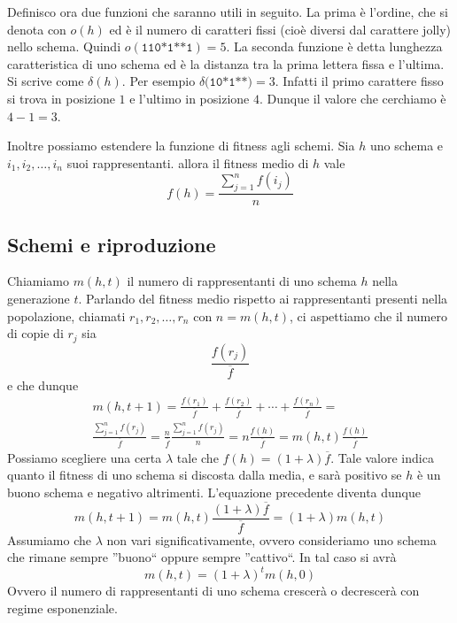 \documentclass[a4paper, 11pt]{article}
\newcommand{\code}{\texttt}
\begin{document}
Definisco ora due funzioni che saranno utili in seguito. La prima \`e l'ordine,
che si denota con $o(h)$ ed \`e il numero di caratteri fissi (cio\`e diversi dal
carattere jolly) nello schema. Quindi $o(\code{110*1**1})=5$. La seconda
funzione \`e detta lunghezza caratteristica di uno schema ed \`e la distanza tra
la prima lettera fissa e l'ultima. Si scrive come $\delta(h)$. Per esempio
$\delta( \code{10*1**)} = 3$. Infatti il primo carattere fisso si trova in
posizione $1$ e l'ultimo in posizione $4$.  Dunque il valore che cerchiamo \`e
$4-1=3$.

Inoltre possiamo estendere la funzione di fitness agli schemi. Sia $h$ uno
schema e $i_1, i_2, \ldots ,i_n$ suoi rappresentanti. allora il fitness medio di
$h$ vale $$f(h)=\frac{\sum\limits_{j=1}^n f(i_j)}{n}$$



\subsection{Schemi e riproduzione}

Chiamiamo $m(h, t)$ il numero di rappresentanti di uno schema $h$ nella
generazione $t$. Parlando del fitness medio rispetto ai rappresentanti presenti
nella popolazione, chiamati $r_1, r_2, \ldots, r_n$ con $n=m(h,t)$, ci
aspettiamo che il numero di copie di $r_j$ sia 
$$\frac{f(r_j)}{\overline{f}}$$
e che dunque
\begin{align*}
m(h,t+1) =
\frac{f(r_1)}{\overline{f}}
+\frac{f(r_2)}{\overline{f}}+ \cdots +
\frac{f(r_n)}{\overline{f}} =\\
\frac{\sum\limits_{j=1}^n f(r_j)}{\overline{f}} =
\frac{n}{\overline{f}} \frac{\sum\limits_{j=1}^n f(r_j)} {n} = n \frac{f(h)}{\overline{f}} = m(h,t)\frac{f(h)}{\overline{f}}
\end{align*}
Possiamo scegliere una certa $\lambda$ tale che $f(h)=(1+\lambda
)\overline{f}$. Tale valore indica quanto il fitness di uno schema si discosta
dalla media, e sar\`a positivo se $h$ \`e un buono schema e negativo
altrimenti. L'equazione precedente diventa dunque
$$m(h,t+1)=m(h,t)\frac{(1+\lambda )\overline{f}}{\overline{f}}=(1+\lambda
)m(h,t)$$
Assumiamo che $\lambda$ non vari significativamente, ovvero consideriamo uno
schema che rimane sempre ''buono`` oppure sempre ''cattivo``. In tal caso si
avr\`a
$$m(h,t)=(1+\lambda)^tm(h,0)$$
Ovvero il numero di rappresentanti di uno schema crescer\`a o decrescer\`a con
regime esponenziale.
\end{document}
